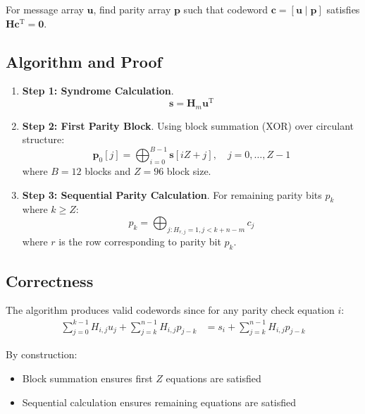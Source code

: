 \documentclass[12pt]{scrreprt}
\begin{document}
	For message array $\mathbf{u}$, find parity array $\mathbf{p}$ such that codeword $\mathbf{c} = [\mathbf{u} \mid \mathbf{p}]$ satisfies $\mathbf{H}\mathbf{c}^\mathrm{T} = \mathbf{0}$.
	
	\subsection*{Algorithm and Proof}
	\begin{enumerate}
		\item [$\blacksquare$] \textbf{Step 1: Syndrome Calculation}.
		\begin{equation}
			\mathbf{s} = \mathbf{H}_m \mathbf{u}^\mathrm{T}
		\end{equation}
		
		\item [$\blacksquare$] 	\textbf{Step 2: First Parity Block}.
		Using block summation (XOR) over circulant structure:
		\begin{equation}
			\mathbf{p}_0[j] = \bigoplus_{i=0}^{B-1} \mathbf{s}[iZ + j], \quad j = 0, \ldots, Z-1
		\end{equation}
		where $B = 12$ blocks and $Z = 96$ block size.
		
		\item [$\blacksquare$] \textbf{Step 3: Sequential Parity Calculation}.
		For remaining parity bits $p_k$ where $k \geq Z$:
		\begin{equation}
			p_k = \bigoplus_{j: H_{r,j}=1, j < k+n-m} c_j
		\end{equation}
		where $r$ is the row corresponding to parity bit $p_k$.
		
		
	\end{enumerate}
	
	

	\subsection*{Correctness}
	
	The algorithm produces valid codewords since for any parity check equation $i$:
	\begin{align}
		\sum_{j=0}^{k-1} H_{i,j} u_j + \sum_{j=k}^{n-1} H_{i,j} p_{j-k} &= s_i + \sum_{j=k}^{n-1} H_{i,j} p_{j-k}
	\end{align}
	
	By construction:
	\begin{itemize}
		\item Block summation ensures first $Z$ equations are satisfied
		\item Sequential calculation ensures remaining equations are satisfied
	\end{itemize}
	
\end{document}
